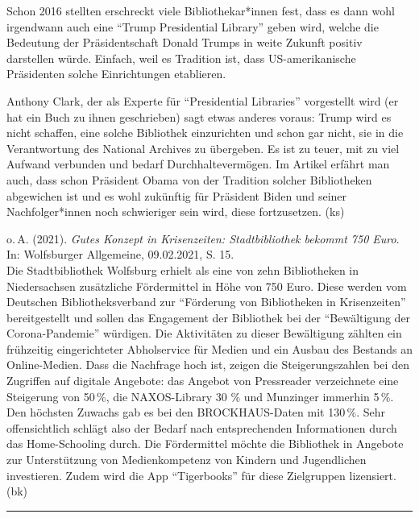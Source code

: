 \documentclass[a4paper,
fontsize=11pt,
oneside,
numbers=noperiodatend,
parskip=half-,
bibliography=totoc,
final
]{scrartcl}
\begin{document}
Schon 2016 stellten erschreckt viele Bibliothekar*innen fest, dass es
dann wohl irgendwann auch eine \enquote{Trump Presidential Library}
geben wird, welche die Bedeutung der Präsidentschaft Donald Trumps in
weite Zukunft positiv darstellen würde. Einfach, weil es Tradition ist,
dass US-amerikanische Präsidenten solche Einrichtungen etablieren.

Anthony Clark, der als Experte für \enquote{Presidential Libraries}
vorgestellt wird (er hat ein Buch zu ihnen geschrieben) sagt etwas
anderes voraus: Trump wird es nicht schaffen, eine solche Bibliothek
einzurichten und schon gar nicht, sie in die Verantwortung des National
Archives zu übergeben. Es ist zu teuer, mit zu viel Aufwand verbunden
und bedarf Durchhaltevermögen. Im Artikel erfährt man auch, dass schon
Präsident Obama von der Tradition solcher Bibliotheken abgewichen ist
und es wohl zukünftig für Präsident Biden und seiner Nachfolger*innen
noch schwieriger sein wird, diese fortzusetzen. (ks)

\pagebreak

o.\,A. (2021). \emph{Gutes Konzept in Krisenzeiten: Stadtbibliothek
bekommt 750 Euro}. In: Wolfsburger Allgemeine, 09.02.2021, S. 15.\\
Die Stadtbibliothek Wolfsburg erhielt als eine von zehn Bibliotheken in
Niedersachsen zusätzliche Fördermittel in Höhe von 750 Euro. Diese
werden vom Deutschen Bibliotheksverband zur \enquote{Förderung von
Bibliotheken in Krisenzeiten} bereitgestellt und sollen das Engagement
der Bibliothek bei der \enquote{Bewältigung der Corona-Pandemie}
würdigen. Die Aktivitäten zu dieser Bewältigung zählten ein frühzeitig
eingerichteter Abholservice für Medien und ein Ausbau des Bestands an
Online-Medien. Dass die Nachfrage hoch ist, zeigen die Steigerungszahlen
bei den Zugriffen auf digitale Angebote: das Angebot von Pressreader
verzeichnete eine Steigerung von 50\,\%, die NAXOS-Library 30 \% und
Munzinger immerhin 5\,\%. Den höchsten Zuwachs gab es bei den
BROCKHAUS-Daten mit 130\,\%. Sehr offensichtlich schlägt also der Bedarf
nach entsprechenden Informationen durch das Home-Schooling durch. Die
Fördermittel möchte die Bibliothek in Angebote zur Unterstützung von
Medienkompetenz von Kindern und Jugendlichen investieren. Zudem wird die
App \enquote{Tigerbooks} für diese Zielgruppen lizensiert. (bk)

\begin{center}\rule{0.5\linewidth}{0.5pt}\end{center}
\end{document}

